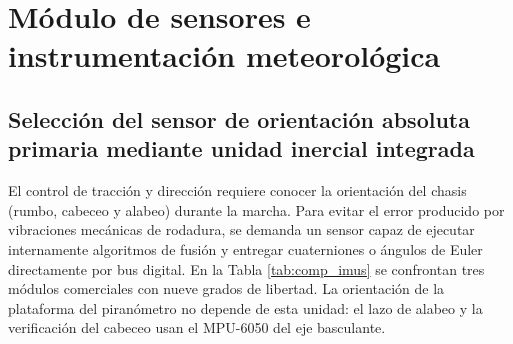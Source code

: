 \documentclass[../../General.tex]{subfiles}
\begin{document}
\section{Módulo de sensores e instrumentación meteorológica}

\subsection{Selección del sensor de orientación absoluta primaria mediante unidad inercial integrada}

El control de tracción y dirección requiere conocer la orientación del chasis (rumbo, cabeceo y alabeo) durante la marcha. Para evitar el error producido por vibraciones mecánicas de rodadura, se demanda un sensor capaz de ejecutar internamente algoritmos de fusión y entregar cuaterniones o ángulos de Euler directamente por bus digital. En la Tabla \ref{tab:comp_imus} se confrontan tres módulos comerciales con nueve grados de libertad. La orientación de la plataforma del piranómetro no depende de esta unidad: el lazo de alabeo y la verificación del cabeceo usan el MPU-6050 del eje basculante.
\end{document}
